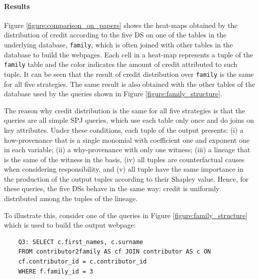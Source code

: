 \documentclass[preprint,12pt,sort&compress]{elsarticle}
\newcommand{\rtwo}[1]{\textcolor{reviewer2}{#1}}
\begin{document}
\paragraph{Results} Figure \ref{figure:comparison_on_papers} shows the heat-maps obtained by the distribution of credit according to the \rtwo{five} DS on one of the tables in the underlying database, \texttt{family}, 
which is often joined with other tables in the database to build the webpages. Each cell in a heat-map represents a tuple of the \texttt{family} table and the color indicates the amount of credit attributed to such tuple.
It can be seen that the result of  credit distribution over \texttt{family} is the same for all \rtwo{five} strategies. The same result is also obtained with the other tables of the database used by the queries shown in Figure \ref{figure:family_structure}. 

The reason why credit distribution is the same for all \rtwo{five} strategies is that the queries are all simple SPJ queries, which use each table only once and do joins on key attributes. 
Under these conditions, each tuple of the output presents: (i) a how-provenance that is a single monomial with coefficient one and exponent one in each variable; (ii) a why-provenance with only one witness; (iii) a lineage that is the same of the witness in the basis, \rtwo{(iv) all tuples are counterfactual causes when considering responsibility, and (v) all tuple have the same importance in the production of the output tuples according to their Shapley value}.
Hence, for these queries, the \rtwo{five} DSs behave in the same way: credit is uniformly distributed among the tuples of the lineage. 

To illustrate this, consider one of the queries in Figure \ref{figure:family_structure} which is used to build the output webpage:

\vspace{2mm}
{\footnotesize
\begin{adjustwidth}{25pt}{5pt}
	\begin{verbatim}
	Q3: SELECT c.first_names, c.surname
	FROM contributor2family AS cf JOIN contributor AS c ON 
	cf.contributor_id = c.contributor_id 
	WHERE f.family_id = 3
\end{verbatim}
\end{adjustwidth}
}
\vspace{2mm}
\end{document}
